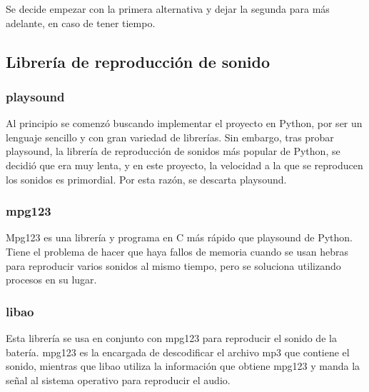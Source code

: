         Se decide empezar con la primera alternativa y dejar la segunda para más adelante, en caso de tener tiempo.

        \subsection{Librería de reproducción de sonido} %
        \label{sub:LibreriaDeReproduccionDeSonido}

            \subsubsection{playsound} %
            \label{ssub:Playsound}

                Al principio se comenzó buscando implementar el proyecto en Python, por ser un lenguaje sencillo y con
                gran variedad de librerías. Sin embargo, tras probar playsound\cite{playsound}, la librería de
                reproducción de sonidos más popular de Python, se decidió que era muy lenta, y en este proyecto, la
                velocidad a la que se reproducen los sonidos es primordial. Por esta razón, se descarta playsound.


            \subsubsection{mpg123} %
            \label{ssub:Mpg123}

                Mpg123\cite{mpg123} es una librería y programa en C más rápido que playsound de Python. Tiene el problema de
                hacer que haya fallos de memoria cuando se usan hebras para reproducir varios sonidos al mismo tiempo, pero
                se soluciona utilizando procesos en su lugar.


            \subsubsection{libao} %
            \label{ssub:Libao}

                Esta librería se usa en conjunto con mpg123 para reproducir el sonido de la batería.
                mpg123 es la encargada de descodificar el archivo mp3 que contiene el sonido, mientras que
                libao\cite{libao} utiliza la información que obtiene mpg123 y manda la señal al sistema operativo para
                reproducir el audio.


